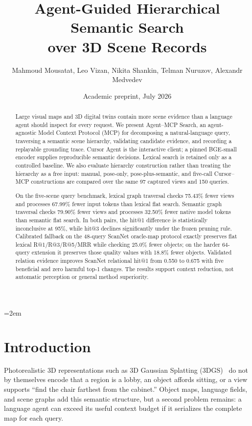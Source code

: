 \documentclass[10pt,twocolumn,letterpaper]{article}
\title{Agent-Guided Hierarchical Semantic Search\\over 3D Scene Records}
\author{
Mahmoud Mousatat, Leo Vizan, Nikita Shankin, Telman Nuruzov, Alexandr Medvedev
}
\date{Academic preprint, July 2026}
\newcommand{\method}{Agent--MCP Search}
\begin{document}
\emergencystretch=2em
\flushbottom
\maketitle

\begin{abstract}
Large visual maps and 3D digital twins contain more scene evidence than a
language agent should inspect for every request. We present \method, an
agent-agnostic Model Context Protocol (MCP) for decomposing a natural-language
query, traversing a semantic scene hierarchy, validating candidate evidence,
and recording a replayable grounding trace. Cursor Agent is the interactive
client; a pinned BGE-small encoder supplies reproducible semantic decisions.
Lexical search is retained only as a controlled baseline. We also evaluate
hierarchy construction rather than treating the hierarchy as a free input:
manual, pose-only, pose-plus-semantic, and five-call Cursor--MCP constructions
are compared over the same 97 captured views and 150 queries.

On the five-scene query benchmark, lexical graph traversal checks 75.43\% fewer
views and processes 67.99\% fewer input tokens than lexical flat search.
Semantic graph traversal checks 79.90\% fewer views and processes 32.50\% fewer
native model tokens than semantic flat search. In both pairs, the hit@1
difference is statistically inconclusive at 95\%, while hit@3 declines
significantly under the frozen pruning rule. Calibrated fallback on the
48-query ScanNet oracle-map protocol exactly preserves flat lexical
R@1/R@3/R@5/MRR while checking 25.0\% fewer objects; on the harder 64-query
extension it preserves those quality values with 18.8\% fewer objects.
Validated relation evidence improves ScanNet relational hit@1 from 0.550 to
0.675 with five beneficial and zero harmful top-1 changes. The results support
context reduction, not automatic perception or general method superiority.
\end{abstract}

\section{Introduction}
Photorealistic 3D representations such as 3D Gaussian Splatting
(3DGS)~\cite{kerbl20233dgs} do not by themselves encode that a region is a
lobby, an object affords sitting, or a view supports ``find the chair farthest
from the cabinet.'' Object maps, language fields, and scene graphs add this
semantic structure, but a second problem remains: a language agent can exceed
its useful context budget if it serializes the complete map for each query.
\end{document}

